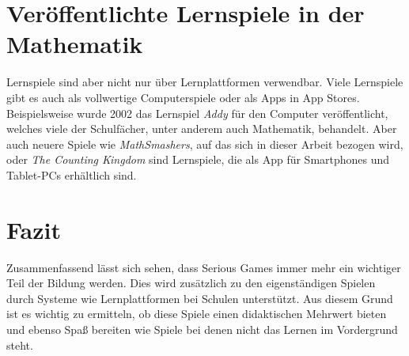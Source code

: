 \section{Veröffentlichte Lernspiele in der Mathematik}
Lernspiele sind aber nicht nur über Lernplattformen verwendbar. Viele Lernspiele gibt es auch als vollwertige Computerspiele oder als Apps in App Stores. Beispielsweise wurde 2002 das Lernspiel \textit{Addy} für den Computer veröffentlicht, welches viele der Schulfächer, unter anderem auch Mathematik, behandelt. Aber auch neuere Spiele wie \textit{MathSmashers}, auf das sich in dieser Arbeit bezogen wird, oder \textit{The Counting Kingdom}\cite{kingdom} sind Lernspiele, die als App für Smartphones und Tablet-PCs erhältlich sind.
\section{Fazit}
Zusammenfassend lässt sich sehen, dass Serious Games immer mehr ein wichtiger Teil der Bildung werden. Dies wird zusätzlich zu den eigenständigen Spielen durch Systeme wie Lernplattformen bei Schulen unterstützt. Aus diesem Grund ist es wichtig zu ermitteln, ob diese Spiele einen didaktischen Mehrwert bieten und ebenso Spaß bereiten wie Spiele bei denen nicht das Lernen im Vordergrund steht.